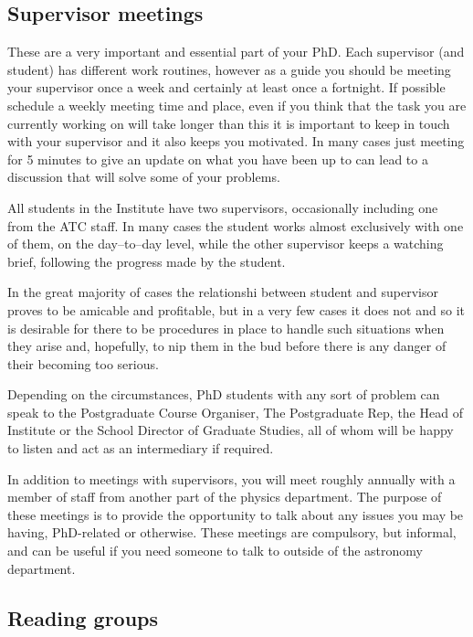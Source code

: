\subsection{Supervisor meetings}

These are a very important and essential part of your PhD. Each
supervisor (and student) has different work routines, however as a
guide you should be meeting your supervisor once a week and certainly
at least once a fortnight.  If possible schedule a weekly meeting time
and place, even if you think that the task you are currently working on
will take longer than this it is important to keep in touch with your supervisor and it also keeps
you motivated.  In many cases just meeting for 5 minutes to give an
update on what you have been up to can lead to a discussion that will
solve some of your problems.

All students in the Institute have two supervisors, occasionally
including one from the ATC staff. In many cases the student
works almost exclusively with one of them,
on the day--to--day level, while the other supervisor keeps a watching
brief, following the progress made by the student.

In the great majority of cases the relationshi between student and supervisor proves to be
amicable and profitable,  but in a very few cases
it does not and so it is desirable for there to be procedures in place
to handle such situations when they arise and, hopefully, to nip them
in the bud before there is any danger of their becoming too serious.

Depending on the circumstances, PhD students with any sort of problem
can speak to the Postgraduate Course Organiser,
The Postgraduate Rep, the Head of Institute or the School Director of Graduate Studies, all of whom
will be happy to listen and act as an intermediary if required.

In addition to meetings with supervisors, you will meet roughly annually with a member of staff from another part of the physics department. The purpose of these meetings is to provide the opportunity to talk about any issues you may be having, PhD-related or otherwise. These meetings are compulsory, but informal, and can be useful if you need someone to talk to outside of the astronomy department. 

\subsection{Reading groups}

